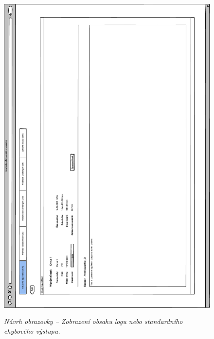 \begin{figure}[H]
\begin{center}
    \scalebox{0.78}
    {   
        \includegraphics{images/wireframe_appendix_contentLogOrStderr.pdf}
    }
    \caption{\label{obr:wireframe_appendix_contentLogOrStderr} {\it Návrh obrazovky -- Zobrazení obsahu logu nebo standardního chybového výstupu.}}
\end{center}
\end{figure}


